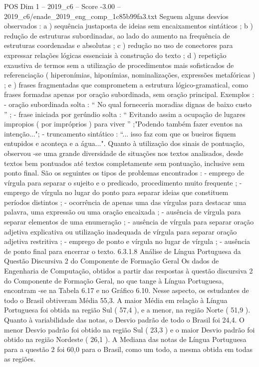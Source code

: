 \begin{textsample}{POS Dim 1 – 2019\_c6 – Score -3.00 – 2019\_c6/enade\_2019\_eng\_comp\_1c85b99fa3.txt}
Seguem alguns desvios observados : a ) sequência justaposta de ideias sem encaixamentos sintáticos ; b ) redução de estruturas subordinadas, ao lado do aumento na frequência de estruturas coordenadas e absolutas ; c ) redução no uso de conectores para expressar relações lógicas essenciais à construção do texto ; d ) repetição exaustiva de termos sem a utilização de procedimentos mais sofisticados de referenciação ( hiperonímias, hiponímias, nominalizações, expressões metafóricas ) ; e ) frases fragmentadas que comprometem a estrutura lógico-gramatical, como frases formadas apenas por oração subordinada, sem oração principal.
Exemplos : - oração subordinada solta : “ No qual forneceria moradias dignas de baixo custo ” ; - frase iniciada por gerúndio solta : “ Evitando assim a ocupação de lugares impropios ( por impróprios ) para viver ” ;"Podendo também fazer eventos na intenção..."; - truncamento sintático : “... isso faz com que os bueiros fiquem entupidos e aconteça e a água...".
Quanto à utilização dos sinais de pontuação, observou -se uma grande diversidade de situações nos textos analisados, desde textos bem pontuados até textos completamente sem pontuação, inclusive sem ponto final.
São os seguintes os tipos de problemas encontrados : - emprego de vírgula para separar o sujeito e o predicado, procedimento muito frequente ; - emprego de vírgula no lugar do ponto para separar ideias que constituem períodos distintos ; - ocorrência de apenas uma das vírgulas para destacar uma palavra, uma expressão ou uma oração encaixada ; - ausência de vírgula para separar elementos de uma enumeração ; - ausência de vírgula para separar oração adjetiva explicativa ou utilização inadequada de vírgula para separar oração adjetiva restritiva ; - emprego de ponto e vírgula no lugar de vírgula ; - ausência de ponto final para encerrar o texto. 6.3.1.8 Análise de Língua Portuguesa da Questão Discursiva 2 do Componente de Formação Geral Os dados de Engenharia de Computação, obtidos a partir das respostas à questão discursiva 2 do Componente de Formação Geral, no que tange à Língua Portuguesa, encontram -se na Tabela 6.17 e no Gráfico 6.10.
Nesse aspecto, os estudantes de todo o Brasil obtiveram Média 55,3.
A maior Média em relação à Língua Portuguesa foi obtida na região Sul ( 57,4 ), e a menor, na região Norte ( 51,9 ).
Quanto à variabilidade das notas, o Desvio padrão de todo o Brasil foi 24,4.
O menor Desvio padrão foi obtido na região Sul ( 23,3 ) e o maior Desvio padrão foi obtido na região Nordeste ( 26,1 ).
A Mediana das notas de Língua Portuguesa para a questão 2 foi 60,0 para o Brasil, como um todo, a mesma obtida em todas as regiões.

\end{textsample}
